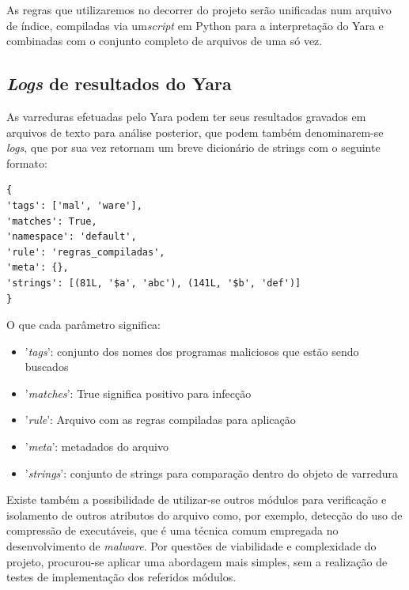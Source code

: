 As regras que utilizaremos no decorrer do projeto serão unificadas num arquivo de índice, compiladas via um\textit{script} em Python para a interpretação do Yara e combinadas com o conjunto completo de arquivos de uma só vez.

\subsection{\textit{Logs} de resultados do Yara} %
\label{sub:logs_de_resultados_do_yara}

As varreduras efetuadas pelo Yara podem ter seus resultados gravados em arquivos
de texto para análise posterior, que podem também denominarem-se
\textit{logs}, que por sua vez retornam um  breve dicionário de strings com o seguinte
formato:

\begin{lstlisting}[caption=Conteúdo dos arquivos de resultado de varredura, label=resultyara]
{
'tags': ['mal', 'ware'],
'matches': True,
'namespace': 'default',
'rule': 'regras_compiladas',
'meta': {},
'strings': [(81L, '$a', 'abc'), (141L, '$b', 'def')]
}
\end{lstlisting}

O que cada parâmetro significa:
\begin{itemize}
	\item '\textit{tags}': conjunto dos nomes dos programas maliciosos que estão sendo buscados

	\item '\textit{matches}': True significa positivo para infecção

	\item '\textit{rule}': Arquivo com as regras compiladas para aplicação

	\item '\textit{meta}': metadados do arquivo

	\item '\textit{strings}': conjunto de strings para comparação dentro do objeto de varredura
\end{itemize}

Existe também a possibilidade de utilizar-se outros módulos para verificação e
isolamento de outros atributos do arquivo como, por exemplo, detecção do uso de
compressão de executáveis, que é uma técnica comum empregada no desenvolvimento
de \textit{malware}. Por questões de viabilidade e complexidade do projeto,
procurou-se aplicar uma abordagem mais simples, sem a realização de testes de
implementação dos referidos módulos.

